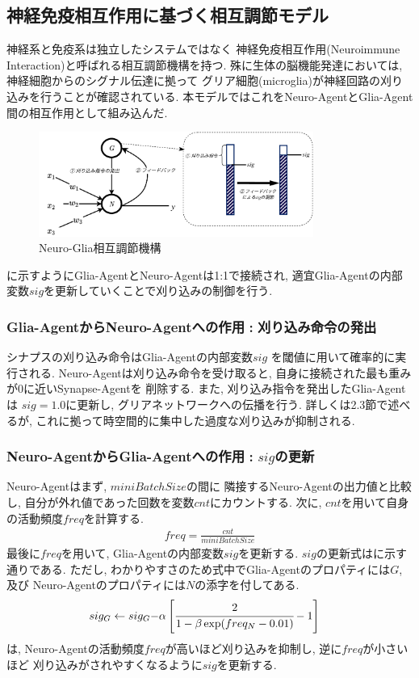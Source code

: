 \documentclass[a4paper, 9pt,twocolumn,dvipdfmx]{jsarticle}
\begin{document}
\subsection{神経免疫相互作用に基づく相互調節モデル}
神経系と免疫系は独立したシステムではなく
神経免疫相互作用(Neuroimmune Interaction)と呼ばれる相互調節機構を持つ.
殊に生体の脳機能発達においては, 神経細胞からのシグナル伝達に拠って
グリア細胞(microglia)が神経回路の刈り込みを行うことが確認されている.
本モデルではこれをNeuro-AgentとGlia-Agent間の相互作用として組み込んだ.
\vspace{-5mm}
\begin{figure}[H]
  \centering
  \includegraphics[width=9cm]{NewDeal.pdf}  
  \caption{Neuro-Glia相互調節機構}
  \label{fig:NeuroGlia}
\end{figure}
\vspace{-5mm}
に示すようにGlia-AgentとNeuro-Agentは1:1で接続され, 
 適宜Glia-Agentの内部変数$sig$を更新していくことで刈り込みの制御を行う.
 \vspace{1mm}
\subsubsection*{Glia-AgentからNeuro-Agentへの作用\,\,:\,\,刈り込み命令の発出}
シナプスの刈り込み命令はGlia-Agentの内部変数$sig$
を閾値に用いて確率的に実行される.
Neuro-Agentは刈り込み命令を受け取ると, 自身に接続された最も重みが0に近いSynapse-Agentを
削除する.
また, 刈り込み指令を発出したGlia-Agentは
$sig=1.0$に更新し, グリアネットワークへの伝播を行う.
詳しくは2.3節で述べるが, これに拠って時空間的に集中した過度な刈り込みが抑制される.
\subsubsection*{Neuro-AgentからGlia-Agentへの作用\,\,:\,\,$sig$の更新}
Neuro-Agentはまず, $miniBatchSize$の間に
隣接するNeuro-Agentの出力値と比較し, 自分が外れ値であった回数を変数$cnt$にカウントする.
次に, $cnt$を用いて自身の活動頻度$freq$を計算する.
\begin{align}
  freq=\displaystyle\frac{cnt}{miniBatchSize}
\end{align}
最後に$freq$を用いて, Glia-Agentの内部変数$sig$を更新する.
$sig$の更新式はに示す通りである. 
ただし, わかりやすさのため式中でGlia-Agentのプロパティには$G$, 及び
Neuro-Agentのプロパティには$N$の添字を付してある.
\begin{align}
  sig_G\leftarrow sig_G-&\alpha\left[\cfrac{2}{1-\beta\exp(freq_N-0.01)}-1\right]
  \label{eq:sig}
\end{align}
は, Neuro-Agentの活動頻度$freq$が高いほど刈り込みを抑制し, 逆に$freq$が小さいほど
刈り込みがされやすくなるように$sig$を更新する.
\end{document}

